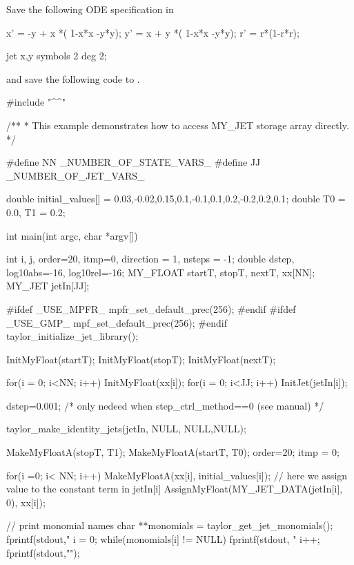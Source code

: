 \documentclass[10pt]{article}
\theoremstyle{remark}
\newcommand{\inputfile}{}
\newcommand{\mainfile}{}
\newcommand{\odehfile}{}
\begin{document}
\vspace{4mm}
Save the following ODE specification in \inputfile{}
\begin{code}[title={File: \inputfile{}}]
    x' = -y + x *( 1-x*x -y*y);
    y' =  x + y *( 1-x*x -y*y);
    r' = r*(1-r*r);
    
    jet x,y  symbols 2 deg 2;
\end{code}
and save the following code to \mainfile{}.
\begin{code}[title={File: \mainfile{}}]
    #include "^\odehfile{}^"
    
    /**
     *  This example demonstrates how to access MY_JET storage array directly.
     */
    
    #define NN  _NUMBER_OF_STATE_VARS_
    #define JJ  _NUMBER_OF_JET_VARS_ 
    
    double initial_values[] = {0.03,-0.02,0.15,0.1,-0.1,0.1,0.2,-0.2,0.2,0.1};
    double T0 = 0.0, T1 = 0.2;
     
    int main(int argc, char *argv[])
    {
    	 int       i, j, order=20, itmp=0, direction = 1, nsteps = -1;
    	 double    dstep, log10abs=-16, log10rel=-16;
    	 MY_FLOAT  startT, stopT, nextT, xx[NN];
    	 MY_JET    jetIn[JJ];
    	 
    #ifdef _USE_MPFR_	 
    	 mpfr_set_default_prec(256);
    #endif
    #ifdef _USE_GMP_	 
    	 mpf_set_default_prec(256);
    #endif	 
    	 taylor_initialize_jet_library();
    	 
    	 InitMyFloat(startT);
    	 InitMyFloat(stopT);
    	 InitMyFloat(nextT);
    	 
    	 for(i = 0; i<NN; i++) {InitMyFloat(xx[i]);}
    	 for(i = 0; i<JJ; i++) {InitJet(jetIn[i]);}
    
    
    	 dstep=0.001; /* only nedeed when step_ctrl_method==0 (see manual) */
    
    	 taylor_make_identity_jets(jetIn, NULL, NULL,NULL);
    
    	 MakeMyFloatA(stopT, T1);
    	 MakeMyFloatA(startT, T0);	 
    	 order=20;
    	 itmp = 0;
    
    	 for(i =0; i< NN; i++) {
    	   MakeMyFloatA(xx[i],  initial_values[i]);
    	   // here we assign value to the constant term in jetIn[i]
    	   AssignMyFloat(MY_JET_DATA(jetIn[i], 0),  xx[i]);	   	   
    	 }
    
    	 // print monomial names
    	 {
    	   char **monomials = taylor_get_jet_monomials();
    	   fprintf(stdout,"%
    	   i = 0;
    	   while(monomials[i] != NULL) {
    	     fprintf(stdout, "%
    	     i++;
    	   }
    	   fprintf(stdout,"\n");
    	 }
    	 
}
\end{code}
\end{document}
